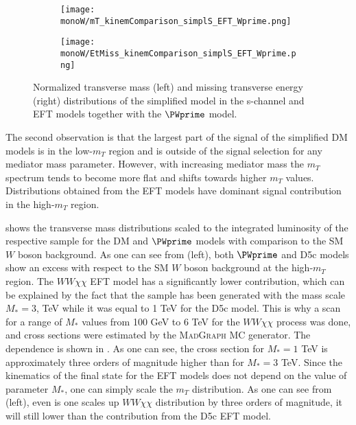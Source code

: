 \begin{figure}[]
\begin{subfigure}{.5\textwidth}
  \centering
  \texttt{[image: monoW/mT\_kinemComparison\_simplS\_EFT\_Wprime.png]}
\end{subfigure}%
\begin{subfigure}{.5\textwidth}
  \centering
  \texttt{[image: monoW/EtMiss\_kinemComparison\_simplS\_EFT\_Wprime.png]}
\end{subfigure}
\caption{Normalized transverse mass (left) and missing transverse energy (right) distributions of the simplified model in the s-channel and EFT models together with the $\PWprime$ model.}
  \label{fig:kinematicsSChannel}
\end{figure}

The second observation is that the largest part of the signal of the simplified DM models 
is in the low-$m_{T}$ region and is outside of the signal selection for any mediator mass parameter.
However, with increasing mediator mass the $m_{T}$ spectrum tends to become 
more flat and shifts towards higher $m_{T}$ values.
Distributions obtained from the EFT models have dominant signal contribution in the high-$m_T$ region.

 shows the transverse mass distributions
scaled to the integrated luminosity of the respective sample for the DM and $\PWprime$ models with comparison to the SM $W$ boson background.
As one can see from  (left), both $\PWprime$ and 
D5c models show an excess with respect to the SM $W$ boson background at the high-$m_T$ region. The $WW\chi\chi$ EFT model has a significantly lower contribution, which can be explained by the fact that the sample has been generated with the mass scale $M_{*} = 3$, TeV while it was equal to 1 TeV for the D5c model. 
This is why a scan for a range of $M_{*}$ values from 100 GeV to 6 TeV for the $WW\chi\chi$ process was done, and cross sections were estimated by the M{\scshape ad}G{\scshape raph} MC generator.
The dependence is shown in .
As one can see, the cross section for $M_{*} = 1$ TeV is approximately three orders of magnitude higher than for $M_{*} = 3$ TeV.
Since the kinematics of the final state for the EFT models does not depend on the value of parameter $M_{*}$, one can simply scale the $m_T$ distribution.
As one can see from  (left), even is one scales up $WW\chi\chi$ distribution by three orders of magnitude, it will still lower than the contribution from the D5c EFT model.

